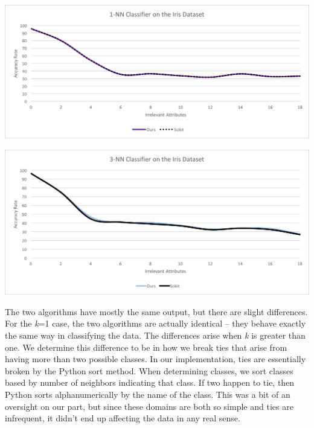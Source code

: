 \documentclass{article}
\begin{document}
\begin{center}
\includegraphics[scale=0.7]{ours-vs-scikit} \\
\end{center}

\begin{center}
\includegraphics[scale=0.7]{ours-vs-scikit2} \\
\end{center}

The two algorithms have mostly the same output, but there are slight differences. For the \textit{k}=1 case, the two algorithms are actually identical -- they behave exactly the same way in classifying the data. The differences arise when \textit{k} is greater than one. We determine this difference to be in how we break ties that arise from having more than two possible classes. In our implementation, ties are essentially broken by the Python sort method. When determining classes, we sort classes based by number of neighbors indicating that class. If two happen to tie, then Python sorts alphanumerically by the name of the class. This was a bit of an oversight on our part, but since these domains are both so simple and ties are infrequent, it didn’t end up affecting the data in any real sense. \\
\end{document}
